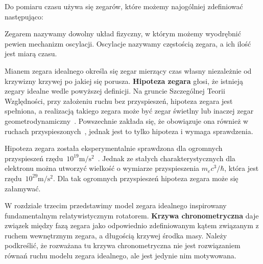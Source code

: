 Do pomiaru czasu używa się zegarów, które możemy 
najogólniej zdefiniować następująco:
\begin{definition}
Zegarem nazywamy dowolny układ fizyczny, w którym możemy wyodrębnić pewien
mechanizm oscylacji. Oscylacje nazywamy częstością zegara, a ich ilość jest
miarą czasu.
\end{definition}
Mianem zegara idealnego określa się zegar mierzący czas własny
niezależnie od krzywizny krzywej po jakiej się porusza.
\textbf{Hipoteza zegara} głosi, że istnieją zegary idealne wedle 
powyższej definicji.
Na gruncie Szczególnej Teorii Względności, przy założeniu ruchu
bez przyspieszeń, hipoteza zegara jest spełniona, a 
realizacją takiego zegara może być zegar świetlny lub inaczej
zegar geometrodynamiczny~\cite{ohanian2013gravitation}.
Powszechnie zakłada się, że obowiązuje 
ona również w ruchach przyspieszonych~\cite{trau1984},
jednak jest to tylko hipoteza i wymaga sprawdzenia.

Hipoteza zegara 
została eksperymentalnie sprawdzona dla ogromnych 
przyspieszeń 
rzędu~$10^{19}\si{\metre\per\second^2}$~\cite{Bailey1977}. Jednak 
ze stałych charakterystycznych dla elektronu 
można utworzyć wielkość o wymiarze przyspieszenia $m_e c^3/\hbar$, 
która jest rzędu~$10^{29}\si{\metre\per\second^2}$. Dla 
tak ogromnych przyspieszeń hipoteza zegara może się załamywać.

W rozdziale trzecim przedstawimy model zegara idealnego inspirowany
fundamentalnym relatywistycznym rotatorem. 
\textbf{Krzywa chronometryczna} daje związek między fazą zegara jako 
odpowiednio zdefiniowanym kątem związanym z ruchem 
wewnętrznym zegara, a długością krzywej 
środka masy. Należy podkreślić, że rozważana 
tu krzywa chronometryczna nie jest rozwiązaniem równań ruchu 
modelu zegara idealnego, ale jest jedynie nim motywowana.

